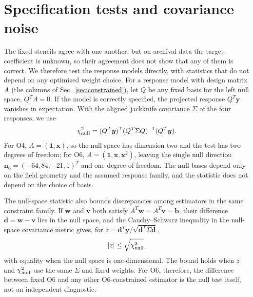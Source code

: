 \documentclass[aps,prd,reprint,twocolumn,superscriptaddress,nofootinbib,longbibliography]{revtex4-2}
\begin{document}
\section{Specification tests and covariance noise}
\label{sec:blue_results}

The fixed stencils agree with one another, but on archival data the target coefficient is unknown, so their agreement does not show that any of them is correct. We therefore test the response models directly, with statistics that do not depend on any optimized weight choice. For a response model with design matrix $A$ (the columns of Sec.~\ref{sec:constrained}), let $Q$ be any fixed basis for the left null space, $Q^TA=0$. If the model is correctly specified, the projected response $Q^T\bm y$ vanishes in expectation. With the aligned jackknife covariance $\Sigma$ of the four responses, we use
\begin{equation}
\chi^2_{\rm null}=(Q^T\bm y)^T(Q^T\Sigma Q)^{-1}(Q^T\bm y).
\label{eq:nullchisq}
\end{equation}
For O4, $A=(\bm 1,\bm x)$, so the null space has dimension two and the test has two degrees of freedom; for O6, $A=(\bm 1,\bm x,\bm x^2)$, leaving the single null direction $\bm n_6=(-64,84,-21,1)^T$ and one degree of freedom. The null bases depend only on the field geometry and the assumed response family, and the statistic does not depend on the choice of basis.

The null-space statistic also bounds discrepancies among estimators in the same constraint family. If $\bm w$ and $\bm v$ both satisfy $A^T\bm w=A^T\bm v=\bm b$, their difference $\bm d=\bm w-\bm v$ lies in the null space, and the Cauchy--Schwarz inequality in the null-space covariance metric gives, for $z=\bm d^T\bm y/\sqrt{\bm d^T\Sigma\bm d}$,
\begin{equation}
|z|\leq\sqrt{\chi^2_{\rm null}},
\label{eq:null_z_bound}
\end{equation}
with equality when the null space is one-dimensional. The bound holds when $z$ and $\chi^2_{\rm null}$ use the same $\Sigma$ and fixed weights. For O6, therefore, the difference between fixed O6 and any other O6-constrained estimator is the null test itself, not an independent diagnostic.
\end{document}
